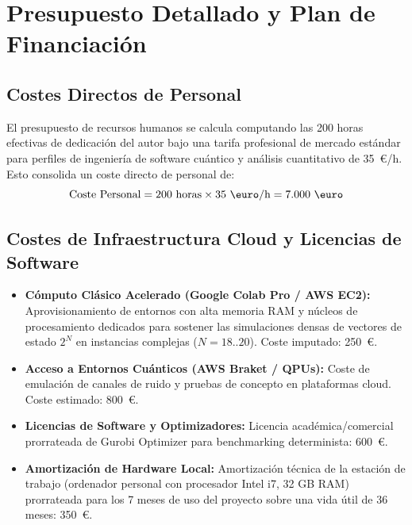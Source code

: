 \section{Presupuesto Detallado y Plan de Financiación}
\label{sec:presupuesto_financiacion}

\subsection{Costes Directos de Personal}
\label{subsec:costes_personal}

El presupuesto de recursos humanos se calcula computando las 200 horas efectivas de dedicación del autor bajo una tarifa profesional de mercado estándar para perfiles de ingeniería de software cuántico y análisis cuantitativo de 35~\euro/h. Esto consolida un coste directo de personal de:
\begin{equation}
    \text{Coste Personal} = 200\text{ horas} \times 35\text{ \euro/h} = 7.000\text{ \euro}
\end{equation}

\subsection{Costes de Infraestructura Cloud y Licencias de Software}
\label{subsec:costes_cloud_software}

\begin{itemize}
    \item \textbf{Cómputo Clásico Acelerado (Google Colab Pro / AWS EC2):} Aprovisionamiento de entornos con alta memoria RAM y núcleos de procesamiento dedicados para sostener las simulaciones densas de vectores de estado $2^N$ en instancias complejas ($N=18..20$). Coste imputado: 250~\euro.
    \item \textbf{Acceso a Entornos Cuánticos (AWS Braket / QPUs):} Coste de emulación de canales de ruido y pruebas de concepto en plataformas cloud. Coste estimado: 800~\euro.
    \item \textbf{Licencias de Software y Optimizadores:} Licencia académica/comercial prorrateada de Gurobi Optimizer para benchmarking determinista: 600~\euro.
    \item \textbf{Amortización de Hardware Local:} Amortización técnica de la estación de trabajo (ordenador personal con procesador Intel i7, 32 GB RAM) prorrateada para los 7 meses de uso del proyecto sobre una vida útil de 36 meses: 350~\euro.
\end{itemize}

